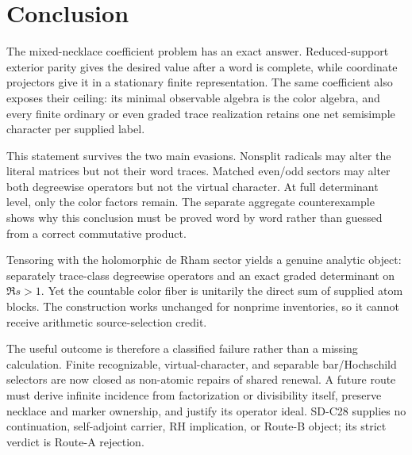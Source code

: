 \section{Conclusion}
\label{sec:conclusion}

The mixed-necklace coefficient problem has an exact answer.  Reduced-support
exterior parity gives the desired value after a word is complete, while
coordinate projectors give it in a stationary finite representation.  The
same coefficient also exposes their ceiling: its minimal observable algebra
is the color algebra, and every finite ordinary or even graded trace
realization retains one net semisimple character per supplied label.

This statement survives the two main evasions.  Nonsplit radicals may alter
the literal matrices but not their word traces.  Matched even/odd sectors may
alter both degreewise operators but not the virtual character.  At full
determinant level, only the color factors remain.  The separate aggregate
counterexample shows why this conclusion must be proved word by word rather
than guessed from a correct commutative product.

Tensoring with the holomorphic de Rham sector yields a genuine analytic
object: separately trace-class degreewise operators and an exact graded
determinant on \(\Re s>1\).  Yet the countable color fiber is unitarily the
direct sum of supplied atom blocks.  The construction works unchanged for
nonprime inventories, so it cannot receive arithmetic source-selection
credit.

The useful outcome is therefore a classified failure rather than a missing
calculation.  Finite recognizable, virtual-character, and separable
bar/Hochschild selectors are now closed as non-atomic repairs of shared
renewal.  A future route must derive infinite incidence from factorization or
divisibility itself, preserve necklace and marker ownership, and justify its
operator ideal.  SD-C28 supplies no continuation, self-adjoint carrier, RH
implication, or Route-B object; its strict verdict is Route-A rejection.
